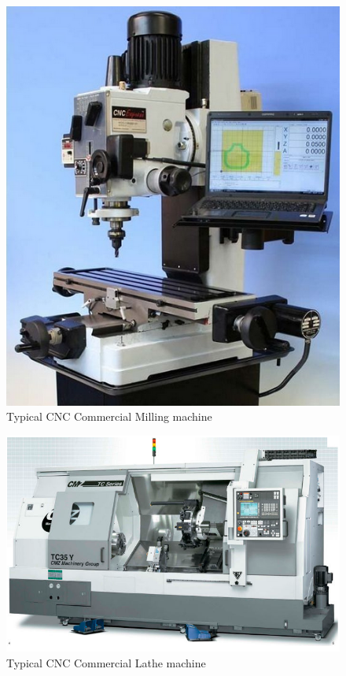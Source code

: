 \clearpage
\pagebreak
\begin{figure}
	\centering
	\caption{Typical CNC Commercial Milling machine}
    \label{CNC-Commercial-Milling-Machine.png}	
	\includegraphics[width=1.00\textwidth]{Chap2/Images/CNC-Commercial-Milling-Machine.png} 
\end{figure}

\clearpage
\pagebreak
\begin{landscape}
\begin{figure}
	\centering
	\caption{Typical CNC Commercial Lathe machine}
    \label{CNC-Commercial-Lathe-Machine.png}	
	\includegraphics[width=1.40\textwidth]{Chap2/Images/CNC-Commercial-Lathe-Machine.png} 
\end{figure}
\end{landscape}



